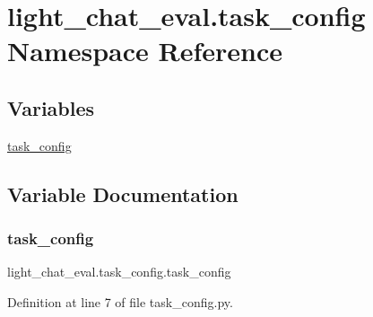 \hypertarget{namespacelight__chat__eval_1_1task__config}{}\section{light\+\_\+chat\+\_\+eval.\+task\+\_\+config Namespace Reference}
\label{namespacelight__chat__eval_1_1task__config}
\subsection*{Variables}
\begin{DoxyCompactItemize}
\item 
\hyperlink{namespacelight__chat__eval_1_1task__config_ae159492c5eab47f93258df0084d7a6f6}{task\+\_\+config}
\end{DoxyCompactItemize}


\subsection{Variable Documentation}
\mbox{\label{namespacelight__chat__eval_1_1task__config_ae159492c5eab47f93258df0084d7a6f6}} 
\subsubsection{\texorpdfstring{task\+\_\+config}{task\_config}}
{\footnotesize\ttfamily light\+\_\+chat\+\_\+eval.\+task\+\_\+config.\+task\+\_\+config}



Definition at line 7 of file task\+\_\+config.\+py.

